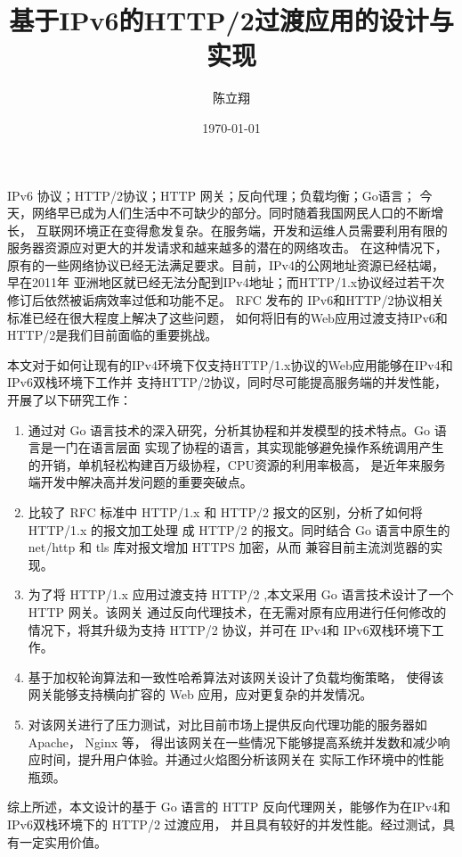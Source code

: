 \documentclass[twoside]{CUGThesis}
\title{基于IPv6的HTTP/2过渡应用的设计与实现} %
\author{陈立翔} %
\date{\today} %
\begin{document}
	\maketitle
	\makestatement

	\begin{cnabstract}{IPv6 协议；HTTP/2协议；HTTP 网关；反向代理；负载均衡；Go语言；}
		今天，网络早已成为人们生活中不可缺少的部分。同时随着我国网民人口的不断增长，
	互联网环境正在变得愈发复杂。在服务端，开发和运维人员需要利用有限的服务器资源应对更大的并发请求和越来越多的潜在的网络攻击。
	在这种情况下，原有的一些网络协议已经无法满足要求。目前，IPv4的公网地址资源已经枯竭，早在2011年
	亚洲地区就已经无法分配到IPv4地址；而HTTP/1.x协议经过若干次修订后依然被诟病效率过低和功能不足。
	RFC 发布的 IPv6和HTTP/2协议相关标准已经在很大程度上解决了这些问题，
	如何将旧有的Web应用过渡支持IPv6和HTTP/2是我们目前面临的重要挑战。\par
		本文对于如何让现有的IPv4环境下仅支持HTTP/1.x协议的Web应用能够在IPv4和IPv6双栈环境下工作并
	支持HTTP/2协议，同时尽可能提高服务端的并发性能，开展了以下研究工作：
	\begin{enumerate}
		\item 通过对 Go 语言技术的深入研究，分析其协程和并发模型的技术特点。Go 语言是一门在语言层面
		实现了协程的语言，其实现能够避免操作系统调用产生的开销，单机轻松构建百万级协程，CPU资源的利用率极高，
		是近年来服务端开发中解决高并发问题的重要突破点。
		\item 比较了 RFC 标准中 HTTP/1.x 和 HTTP/2 报文的区别，分析了如何将 HTTP/1.x 的报文加工处理
		成 HTTP/2 的报文。同时结合 Go 语言中原生的 net/http 和 tls 库对报文增加 HTTPS 加密，从而
		兼容目前主流浏览器的实现。
		\item 为了将 HTTP/1.x 应用过渡支持 HTTP/2 ,本文采用 Go 语言技术设计了一个 HTTP 网关。该网关
		通过反向代理技术，在无需对原有应用进行任何修改的情况下，将其升级为支持 HTTP/2 协议，并可在 IPv4和
		IPv6双栈环境下工作。
		\item 基于加权轮询算法和一致性哈希算法对该网关设计了负载均衡策略，
		使得该网关能够支持横向扩容的 Web 应用，应对更复杂的并发情况。
		\item 对该网关进行了压力测试，对比目前市场上提供反向代理功能的服务器如 Apache， Nginx 等，
		得出该网关在一些情况下能够提高系统并发数和减少响应时间，提升用户体验。并通过火焰图分析该网关在
		实际工作环境中的性能瓶颈。
	\end{enumerate}
		\par
		综上所述，本文设计的基于 Go 语言的 HTTP 反向代理网关，能够作为在IPv4和IPv6双栈环境下的 HTTP/2 过渡应用，
	并且具有较好的并发性能。经过测试，具有一定实用价值。
	\end{cnabstract}
	
\end{document}
